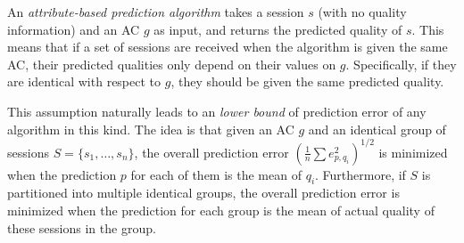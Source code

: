 




An {\it attribute-based prediction algorithm} takes a session $s$ (with no quality information) and an AC $g$ as input, and returns the predicted quality of $s$. This means that if a set of sessions are received when the algorithm is given the same AC, their predicted qualities only depend on their values on $g$. Specifically, if they are identical with respect to $g$, they should be given the same predicted quality. 

\label{subsec:lowerbound}
This assumption naturally leads to an {\it lower bound} of prediction error of any algorithm in this kind. 
The idea is that given an AC $g$ and an identical group of sessions $S=\{s_1,\dots,s_n\}$, the overall prediction error $\left(\frac{1}{n}\sum e_{p,q_i}^2\right)^{1/2}$ is minimized when the prediction $p$ for each of them is the mean of $q_i$. Furthermore, if $S$ is partitioned into multiple identical groups,  the overall prediction error is minimized when the prediction for each group is the mean of actual quality of these sessions in the group. 

